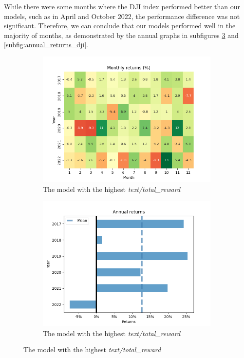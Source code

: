 \documentclass[../xlapes02]{subfiles}
\begin{document}
    While there were some months where the DJI index performed better than our models, such as in April and October 2022, the performance difference was not significant. Therefore, we can conclude that our models performed well in the majority of months, as demonstrated by the annual graphs in subfigures \cref{subfig:annual_returns_max} and \cref{subfig:annual_returns_dji}.

    \begin{figure}[h!]
        \centering
        \begin{subfigure}[t]{\experimentimgwidth\textwidth}
            \centering
            \label{subfig:montly_returns_heatmap_max}
            \includegraphics[width=\linewidth]{image/figure/monthly_returns_heatmap_max}
            \caption{The model with the highest \emph{text/total\_reward}}
        \end{subfigure}
        \hfill
        \begin{subfigure}[t]{\experimentimgwidth\textwidth}
            \centering
            \label{subfig:annual_returns_max}
            \includegraphics[width=\linewidth]{image/figure/annual_returns_max}
            \caption{The model with the highest \emph{text/total\_reward}}
        \end{subfigure}


\end{figure}
\end{document}
